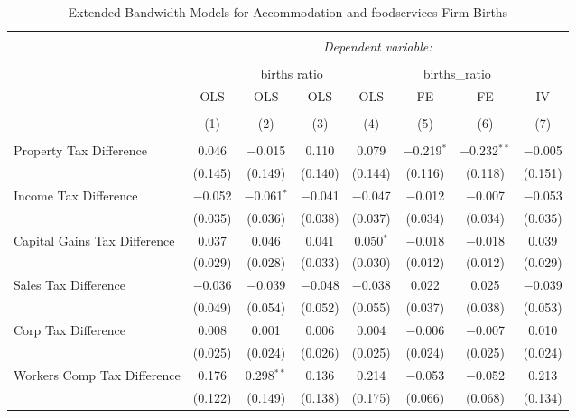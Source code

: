 
\begin{table}[!htbp] \centering 
  \caption{Extended Bandwidth Models for  Accommodation and foodservices Firm Births} 
  \label{} 
\begin{tabular}{@{\extracolsep{5pt}}lccccccc} 
\\[-1.8ex]\hline 
\hline \\[-1.8ex] 
 & \multicolumn{7}{c}{\textit{Dependent variable:}} \\ 
\cline{2-8} 
\\[-1.8ex] & \multicolumn{4}{c}{births ratio} & \multicolumn{2}{c}{births\_ratio} &   \\ 
 & OLS & OLS & OLS & OLS & FE & FE & IV \\ 
\\[-1.8ex] & (1) & (2) & (3) & (4) & (5) & (6) & (7)\\ 
\hline \\[-1.8ex] 
 Property Tax Difference & 0.046 & $-$0.015 & 0.110 & 0.079 & $-$0.219$^{*}$ & $-$0.232$^{**}$ & $-$0.005 \\ 
  & (0.145) & (0.149) & (0.140) & (0.144) & (0.116) & (0.118) & (0.151) \\ 
  Income Tax Difference & $-$0.052 & $-$0.061$^{*}$ & $-$0.041 & $-$0.047 & $-$0.012 & $-$0.007 & $-$0.053 \\ 
  & (0.035) & (0.036) & (0.038) & (0.037) & (0.034) & (0.034) & (0.035) \\ 
  Capital Gains Tax Difference & 0.037 & 0.046 & 0.041 & 0.050$^{*}$ & $-$0.018 & $-$0.018 & 0.039 \\ 
  & (0.029) & (0.028) & (0.033) & (0.030) & (0.012) & (0.012) & (0.029) \\ 
  Sales Tax Difference & $-$0.036 & $-$0.039 & $-$0.048 & $-$0.038 & 0.022 & 0.025 & $-$0.039 \\ 
  & (0.049) & (0.054) & (0.052) & (0.055) & (0.037) & (0.038) & (0.053) \\ 
  Corp Tax Difference & 0.008 & 0.001 & 0.006 & 0.004 & $-$0.006 & $-$0.007 & 0.010 \\ 
  & (0.025) & (0.024) & (0.026) & (0.025) & (0.024) & (0.025) & (0.024) \\ 
  Workers Comp Tax Difference & 0.176 & 0.298$^{**}$ & 0.136 & 0.214 & $-$0.053 & $-$0.052 & 0.213 \\ 
  & (0.122) & (0.149) & (0.138) & (0.175) & (0.066) & (0.068) & (0.134) \\ 

\end{tabular}
\end{table}
